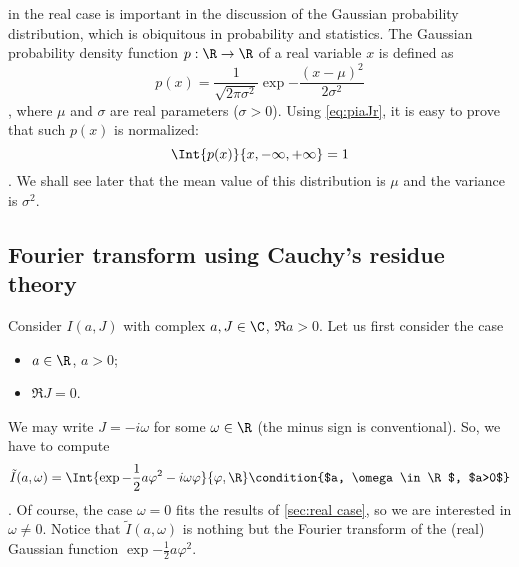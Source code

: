   in the real case is
important in the discussion of the Gaussian probability distribution, which is
obiquitous in probability and statistics. The Gaussian probability density
function $p:\R\rightarrow\R$ of a real variable $x$ is  defined as
\begin{dmath*}
   p(x) = \frac{1}{\sqrt{2\pi\sigma^{2}}} \exp{ - \frac{\left( x -
	    \mu\right)^{2}}{2\sigma^{2}} }
\end{dmath*},
where $\mu$ and $\sigma$ are real parameters ($\sigma>0$).
Using \cref{eq:piaJr}, it is easy to prove that such $p(x)$ is normalized:
\begin{dmath*}
   \Int{p(x)}{x, -\infty, +\infty} = 1 
\end{dmath*}.
We shall see later that the mean value of this distribution is $\mu$ and the
variance is $\sigma^{2}$.

\subsection{Fourier transform using Cauchy's residue theory}
\label{sec:Fourier case}


Consider $I(a,J)$ with complex $a,J\in\C$, $\Re a >0$. 
Let us first consider the case
\begin{itemize}
   \item $a\in\R$, $a>0$;
   \item $\Re J = 0$.
\end{itemize}
We may write $J = -i \omega$ for some $\omega \in\R$ (the minus
sign is conventional).
So, we have to compute
\begin{dmath}[label={piaJi}]
   \tilde{I}( a, \omega) = \Int{ \exp{-\frac{1}{2}a \varphi^{2} - i \omega \varphi}}{ \varphi, \R} 
   \condition{$a, \omega \in \R$, $a>0$}
\end{dmath}.
Of course, the case $\omega=0$ fits the results of \cref{sec:real case},
so we are interested in $\omega\neq 0$.
Notice that
$\tilde{I}(a, \omega)$ is nothing but the Fourier transform of the (real) Gaussian function
$\exp{-\frac{1}{2}a\varphi^{2}}$.


